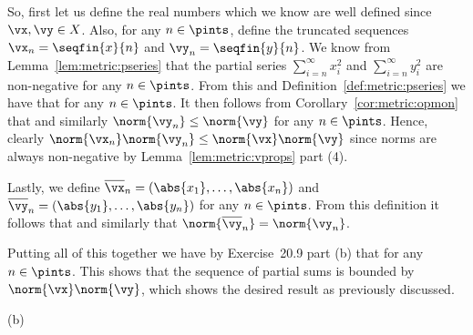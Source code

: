 {{    So, first let us define the real numbers
    which we know are well defined since $\vx, \vy \in X$.
    Also, for any $n \in \pints$, define the truncated sequences $\vx_n = \seqfin{x}{n}$ and $\vy_n = \seqfin{y}{n}$.
    We know from Lemma~\ref{lem:metric:pseries} that the partial series $\sum_{i=n}^\infty x_i^2$ and $\sum_{i=n}^\infty y_i^2$ are non-negative for any $n \in \pints$.
    From this and Definition~\ref{def:metric:pseries} we have that
    for any $n \in \pints$.
    It then follows from Corollary~\ref{cor:metric:opmon} that
    and similarly $\norm{\vy_n} \leq \norm{\vy}$ for any $n \in \pints$.
    Hence, clearly $\norm{\vx_n} \norm{\vy_n} \leq \norm{\vx} \norm{\vy}$ since norms are always non-negative by Lemma~\ref{lem:metric:vprops} part (4).

    Lastly, we define $\vxb_n = (\abs{x_1}, \ldots, \abs{x_n})$ and $\vyb_n = (\abs{y_1}, \ldots, \abs{y_n})$ for any $n \in \pints$.
    From this definition it follows that
    and similarly that $\norm{\vyb_n} = \norm{\vy_n}$.

    Putting all of this together we have by Exercise~20.9 part (b) that
    for any $n \in \pints$.
    This shows that the sequence of partial sums is bounded by $\norm{\vx} \norm{\vy}$, which shows the desired result as previously discussed.
  }

  (b)

}
